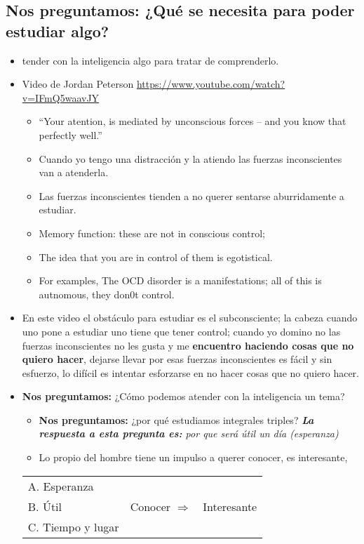 \subsection{\textbf{Nos preguntamos:} ¿Qué se necesita para poder estudiar algo?}
\begin{itemize}
    \item tender con la inteligencia algo para tratar de comprenderlo.
    \item Video de Jordan Peterson \url{https://www.youtube.com/watch?v=IFmQ5waavJY}
        \begin{itemize}
            \item ``Your atention, is mediated by unconscious forces -- and you know that perfectly well.''
            \item Cuando yo tengo una distracción y la atiendo las fuerzas inconscientes van a atenderla.
            \item Las fuerzas inconscientes tienden a no querer sentarse aburridamente a estudiar.
            \item Memory function: these are not in conscious control; 
            \item The idea that you are in control of them is egotistical.
            \item For examples, The OCD disorder is a manifestations; all of this is autnomous, they don0t control.
        \end{itemize}
    
    \item En este video el obstáculo para estudiar es el subconsciente; la cabeza cuando uno pone a estudiar uno tiene que tener control; cuando yo domino no las fuerzas inconscientes no les gusta y me \textbf{encuentro haciendo cosas que no quiero hacer}, dejarse llevar por esas fuerzas inconscientes es fácil y sin esfuerzo, lo difícil es intentar esforzarse en no hacer cosas que no quiero hacer.
    \item \textbf{Nos preguntamos:} ¿Cómo podemos atender con la inteligencia un tema?
        \begin{itemize}
            \item \textbf{Nos preguntamos:} ¿por qué estudiamos integrales triples? \emph{\textbf{La respuesta a esta pregunta es: }por que será útil un día (esperanza)}
            \item Lo propio del hombre tiene un impulso a querer conocer, es interesante, 
        \end{itemize}

        \begin{center}
           \begin{tabular}{ | p{5cm} | p{5cm} p{5cm} | }
               \hline
                A. Esperanza      &                       &      \\
                B. Útil           & Conocer $\Rightarrow$ & Interesante \\ 
                C. Tiempo y lugar &                       &         \\ 
               \hline
           \end{tabular}
        \end{center}


\end{itemize}
